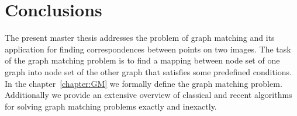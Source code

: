 \chapter{Conclusions } \label{chapter:conclusions}
The present master thesis addresses the problem of graph matching and its application for finding correspondences between points on two images. The task of the graph matching problem is to find a mapping between node set of one graph into node set of the other graph that satisfies some predefined conditions. In the chapter~\ref{chapter:GM} we formally define the graph matching problem. 
Additionally we provide an extensive overview of classical and recent algorithms for solving graph matching problems exactly and inexactly. 



